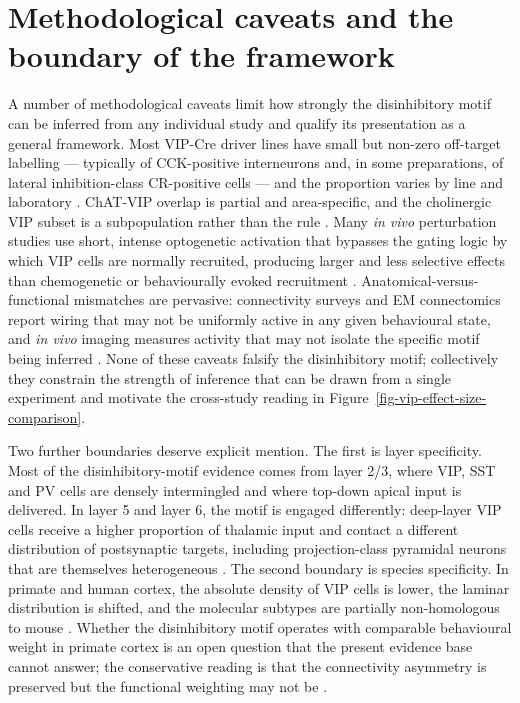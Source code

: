 \documentclass[11pt]{article}
\begin{document}
\section{Methodological caveats and the boundary of the framework}

A number of methodological caveats limit how strongly the disinhibitory motif can be inferred from any individual study and qualify its presentation as a general framework. Most VIP-Cre driver lines have small but non-zero off-target labelling --- typically of CCK-positive interneurons and, in some preparations, of lateral inhibition-class CR-positive cells --- and the proportion varies by line and laboratory \citep{Vanderveer2021, Wei2021}. ChAT-VIP overlap is partial and area-specific, and the cholinergic VIP subset is a subpopulation rather than the rule \citep{Koukouli2017, Posuszny2020, Mcfarlan2024a, Mcfarlan2024b}. Many \textit{in vivo} perturbation studies use short, intense optogenetic activation that bypasses the gating logic by which VIP cells are normally recruited, producing larger and less selective effects than chemogenetic or behaviourally evoked recruitment \citep{Lee2013, Fu2014, Kuchibhotla2017, Veit2023}. Anatomical-versus-functional mismatches are pervasive: connectivity surveys and EM connectomics report wiring that may not be uniformly active in any given behavioural state, and \textit{in vivo} imaging measures activity that may not isolate the specific motif being inferred \citep{Pfeffer2013, Schneidermizell2025, Pakan2016, Dipoppa2018, Garrett2020}. None of these caveats falsify the disinhibitory motif; collectively they constrain the strength of inference that can be drawn from a single experiment and motivate the cross-study reading in Figure~\ref{fig-vip-effect-size-comparison}.

Two further boundaries deserve explicit mention. The first is layer specificity. Most of the disinhibitory-motif evidence comes from layer 2/3, where VIP, SST and PV cells are densely intermingled and where top-down apical input is delivered. In layer 5 and layer 6, the motif is engaged differently: deep-layer VIP cells receive a higher proportion of thalamic input and contact a different distribution of postsynaptic targets, including projection-class pyramidal neurons that are themselves heterogeneous \citep{Anastasiades2021a, Sermet2019, Munoz2017, Schneidermizell2025}. The second boundary is species specificity. In primate and human cortex, the absolute density of VIP cells is lower, the laminar distribution is shifted, and the molecular subtypes are partially non-homologous to mouse \citep{Pronneke2015, Vanderveer2021}. Whether the disinhibitory motif operates with comparable behavioural weight in primate cortex is an open question that the present evidence base cannot answer; the conservative reading is that the connectivity asymmetry is preserved but the functional weighting may not be \citep{Vanderveer2021}.
\end{document}
